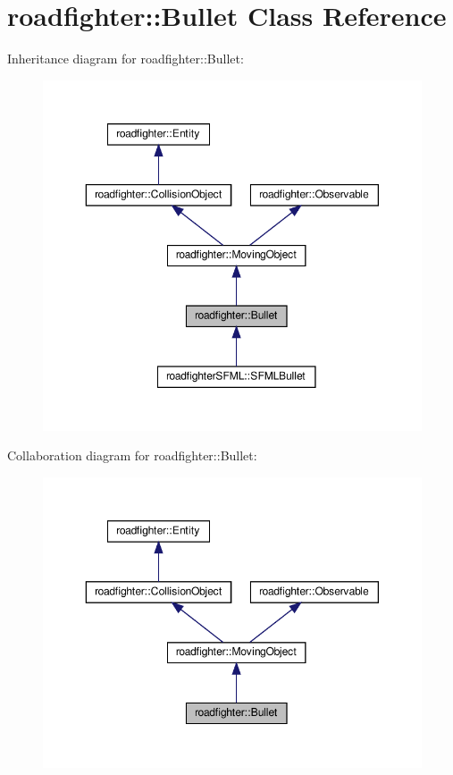 \hypertarget{classroadfighter_1_1Bullet}{}\section{roadfighter\+:\+:Bullet Class Reference}
\label{classroadfighter_1_1Bullet}


Inheritance diagram for roadfighter\+:\+:Bullet\+:
\nopagebreak
\begin{figure}[H]
\begin{center}
\leavevmode
\includegraphics[width=350pt]{classroadfighter_1_1Bullet__inherit__graph}
\end{center}
\end{figure}


Collaboration diagram for roadfighter\+:\+:Bullet\+:
\nopagebreak
\begin{figure}[H]
\begin{center}
\leavevmode
\includegraphics[width=350pt]{classroadfighter_1_1Bullet__coll__graph}
\end{center}
\end{figure}
